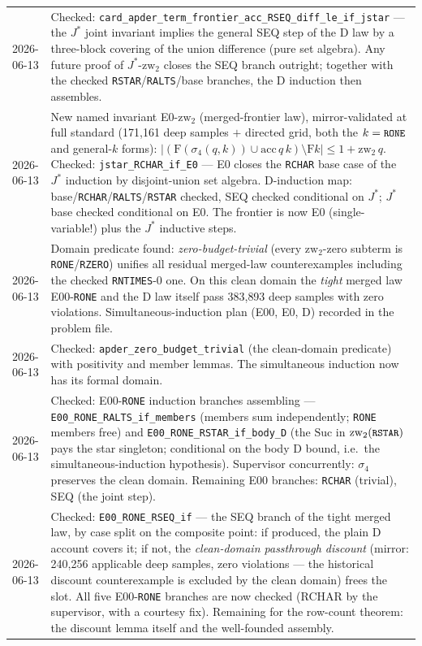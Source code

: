 \documentclass[11pt]{article}
\newcommand{\acc}{\mathrm{acc}}
\newcommand{\F}{\mathrm{F}}
\newcommand{\zw}{\mathrm{zw}}
\newcommand{\code}[1]{\texttt{\small #1}}
\begin{document}
\begin{longtable}{@{}p{}p{}@{}}
2026-06-13 & Checked: \code{card\_apder\_term\_frontier\_acc\_RSEQ\_diff\_le\_if\_jstar} --- the $J^*$ joint invariant implies the general SEQ step of the D law by a three-block covering of the union difference (pure set algebra).  Any future proof of $J^*$-$\zw_2$ closes the SEQ branch outright; together with the checked \code{RSTAR}/\code{RALTS}/base branches, the D induction then assembles. \\
2026-06-13 & New named invariant E0-$\zw_2$ (merged-frontier law), mirror-validated at full standard (171{,}161 deep samples $+$ directed grid, both the $k=\code{RONE}$ and general-$k$ forms): $|(\F(\sigma_4(q,k)) \cup \acc\,q\,k) \setminus \F k| \le 1 + \zw_2\,q$.  Checked: \code{jstar\_RCHAR\_if\_E0} --- E0 closes the \code{RCHAR} base case of the $J^*$ induction by disjoint-union set algebra.  D-induction map: base/\code{RCHAR}/\code{RALTS}/\code{RSTAR} checked, SEQ checked conditional on $J^*$; $J^*$ base checked conditional on E0.  The frontier is now E0 (single-variable!) plus the $J^*$ inductive steps. \\
2026-06-13 & Domain predicate found: \emph{zero-budget-trivial} (every $\zw_2$-zero subterm is \code{RONE}/\code{RZERO}) unifies all residual merged-law counterexamples including the checked \code{RNTIMES}-$0$ one.  On this clean domain the \emph{tight} merged law E00-\code{RONE} and the D law itself pass 383{,}893 deep samples with zero violations.  Simultaneous-induction plan (E00, E0, D) recorded in the problem file. \\
2026-06-13 & Checked: \code{apder\_zero\_budget\_trivial} (the clean-domain predicate) with positivity and member lemmas.  The simultaneous induction now has its formal domain. \\
2026-06-13 & Checked: E00-\code{RONE} induction branches assembling --- \code{E00\_RONE\_RALTS\_if\_members} (members sum independently; \code{RONE} members free) and \code{E00\_RONE\_RSTAR\_if\_body\_D} (the $\mathrm{Suc}$ in $\zw_2(\code{RSTAR})$ pays the star singleton; conditional on the body D bound, i.e.\ the simultaneous-induction hypothesis).  Supervisor concurrently: $\sigma_4$ preserves the clean domain.  Remaining E00 branches: \code{RCHAR} (trivial), SEQ (the joint step). \\
2026-06-13 & Checked: \code{E00\_RONE\_RSEQ\_if} --- the SEQ branch of the tight merged law, by case split on the composite point: if produced, the plain D account covers it; if not, the \emph{clean-domain passthrough discount} (mirror: 240{,}256 applicable deep samples, zero violations --- the historical discount counterexample is excluded by the clean domain) frees the slot.  All five E00-\code{RONE} branches are now checked (RCHAR by the supervisor, with a courtesy fix).  Remaining for the row-count theorem: the discount lemma itself and the well-founded assembly. \\

\end{longtable}
\end{document}
